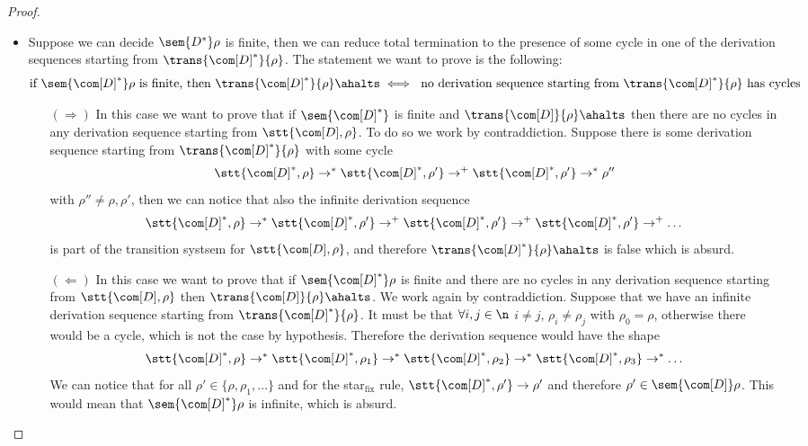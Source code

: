 \begin{proof}
\begin{itemize}
  \item Suppose we can decide \(\sem{D^*}\rho\) is finite, then we can
    reduce total termination to the presence of some cycle in one of
    the derivation sequences starting from
    \(\trans{\com[D]^*}{\rho}\). The statement we want to prove is the
    following:
    \begin{equation*}
      \text{if }\sem{\com[D]^*}\rho \text{ is finite, then } \trans{\com[D]^*}{\rho} \ahalts \iff \text{ no derivation sequence starting from } \trans{\com[D]^*}{\rho} \text{ has cycles}
    \end{equation*}
    \begin{itemize}
    \item[\((\Rightarrow)\)] In this case we want to prove that if
      \(\sem{\com[D]^*}\) is finite and
      \(\trans{\com[D]}{\rho} \ahalts\) then there are no cycles in
      any derivation sequence starting from \(\stt{\com[D],
        \rho}\). To do so we work by contraddiction. Suppose there is
      some derivation sequence starting from
      \(\trans{\com[D]^*}{\rho}\) with some cycle
      \begin{equation*}
        \stt{\com[D]^*, \rho} \to^* \stt{\com[D]^*, \rho'} \to^+ \stt{\com[D]^*, \rho'} \to^* \rho''
      \end{equation*}
      with \(\rho''\neq \rho, \rho'\), then we can notice that also
      the infinite derivation sequence
      \begin{equation*}
        \stt{\com[D]^*, \rho} \to^* \stt{\com[D]^*, \rho'} \to^+ \stt{\com[D]^*, \rho'} \to^+ \stt{\com[D]^*, \rho'} \to^+ \dots
      \end{equation*}
      is part of the transition systsem for \(\stt{\com[D], \rho}\),
      and therefore \(\trans{\com[D]^*}{\rho} \ahalts\) is false which
      is absurd.
    \item[\((\Leftarrow)\)] In this case we want to prove that if
      \(\sem{\com[D]^*}\rho\) is finite and there are no cycles in any
      derivation sequence starting from \(\stt{\com[D], \rho}\) then
      \(\trans{\com[D]}{\rho} \ahalts\). We work again by
      contraddiction. Suppose that we have an infinite derivation
      sequence starting from \(\trans{\com[D]^*}{\rho}\). It must be
      that \(\forall i,j \in \n\) \(i \neq j\), \(\rho_i \neq \rho_j\)
      with \(\rho_0 = \rho\), otherwise there would be a cycle, which
      is not the case by hypothesis. Therefore the derivation sequence
      would have the shape
      \begin{equation*}
        \stt{\com[D]^*, \rho} \to^* \stt{\com[D]^*, \rho_1} \to^* \stt{\com[D]^*, \rho_2} \to^* \stt{\com[D]^*, \rho_3} \to^* \dots
      \end{equation*}
      We can notice that for all \(\rho' \in \{\rho, \rho_1, \dots\}\)
      and for the star\(_{\text{fix}}\) rule,
      \(\stt{\com[D]^*, \rho'} \to \rho'\) and therefore
      \(\rho'\in \sem{\com[D]}\rho\). This would mean that
      \(\sem{\com[D]^*}\rho\) is infinite, which is absurd.
    \end{itemize}
  \end{itemize}
\end{proof}
